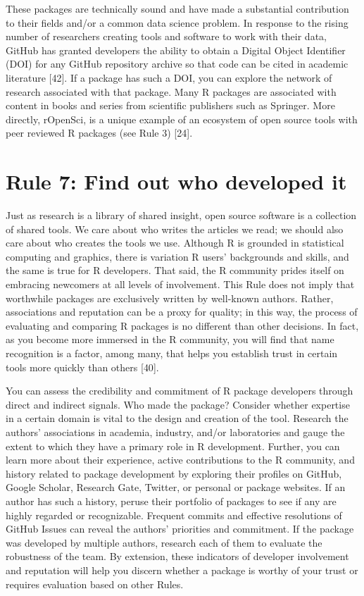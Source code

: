 \documentclass[10pt,letterpaper]{article}
\begin{document}
These packages are technically sound and have made a substantial
contribution to their fields and/or a common data science problem. In
response to the rising number of researchers creating tools and software
to work with their data, GitHub has granted developers the ability to
obtain a Digital Object Identifier (DOI) for any GitHub repository
archive so that code can be cited in academic literature {[}42{]}. If a
package has such a DOI, you can explore the network of research
associated with that package. Many R packages are associated with
content in books and series from scientific publishers such as Springer.
More directly, rOpenSci, is a unique example of an ecosystem of open
source tools with peer reviewed R packages (see Rule 3) {[}24{]}.

\hypertarget{rule-7-find-out-who-developed-it}{%
\section{Rule 7: Find out who developed
it}\label{rule-7-find-out-who-developed-it}}

Just as research is a library of shared insight, open source software is
a collection of shared tools. We care about who writes the articles we
read; we should also care about who creates the tools we use. Although R
is grounded in statistical computing and graphics, there is variation R
users' backgrounds and skills, and the same is true for R developers.
That said, the R community prides itself on embracing newcomers at all
levels of involvement. This Rule does not imply that worthwhile packages
are exclusively written by well-known authors. Rather, associations and
reputation can be a proxy for quality; in this way, the process of
evaluating and comparing R packages is no different than other
decisions. In fact, as you become more immersed in the R community, you
will find that name recognition is a factor, among many, that helps you
establish trust in certain tools more quickly than others {[}40{]}.

You can assess the credibility and commitment of R package developers
through direct and indirect signals. Who made the package? Consider
whether expertise in a certain domain is vital to the design and
creation of the tool. Research the authors' associations in academia,
industry, and/or laboratories and gauge the extent to which they have a
primary role in R development. Further, you can learn more about their
experience, active contributions to the R community, and history related
to package development by exploring their profiles on GitHub, Google
Scholar, Research Gate, Twitter, or personal or package websites. If an
author has such a history, peruse their portfolio of packages to see if
any are highly regarded or recognizable. Frequent commits and effective
resolutions of GitHub Issues can reveal the authors' priorities and
commitment. If the package was developed by multiple authors, research
each of them to evaluate the robustness of the team. By extension, these
indicators of developer involvement and reputation will help you discern
whether a package is worthy of your trust or requires evaluation based
on other Rules.
\end{document}
